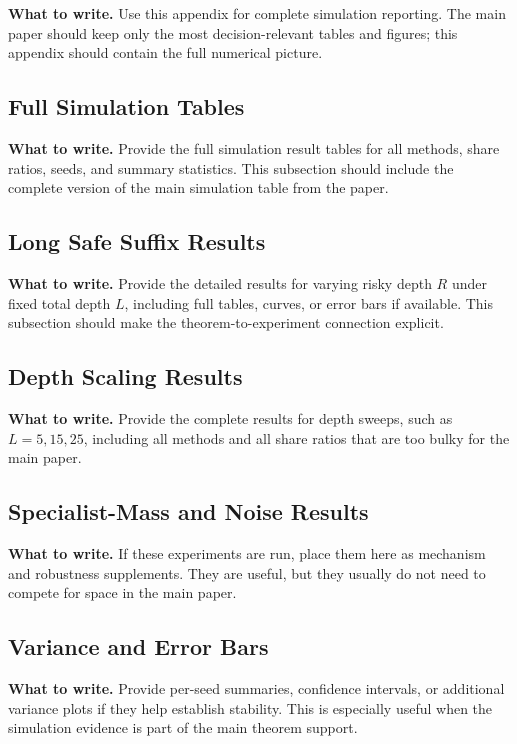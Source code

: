 \documentclass{article}
\newcommand{\towrite}[1]{\noindent\textbf{What to write.} #1}
\begin{document}
\towrite{Use this appendix for complete simulation reporting. The main paper should keep only the most decision-relevant tables and figures; this appendix should contain the full numerical picture.}

\subsection{Full Simulation Tables}

\towrite{Provide the full simulation result tables for all methods, share ratios, seeds, and summary statistics. This subsection should include the complete version of the main simulation table from the paper.}

\subsection{Long Safe Suffix Results}

\towrite{Provide the detailed results for varying risky depth $R$ under fixed total depth $L$, including full tables, curves, or error bars if available. This subsection should make the theorem-to-experiment connection explicit.}

\subsection{Depth Scaling Results}

\towrite{Provide the complete results for depth sweeps, such as $L=5,15,25$, including all methods and all share ratios that are too bulky for the main paper.}

\subsection{Specialist-Mass and Noise Results}

\towrite{If these experiments are run, place them here as mechanism and robustness supplements. They are useful, but they usually do not need to compete for space in the main paper.}

\subsection{Variance and Error Bars}

\towrite{Provide per-seed summaries, confidence intervals, or additional variance plots if they help establish stability. This is especially useful when the simulation evidence is part of the main theorem support.}
\end{document}
